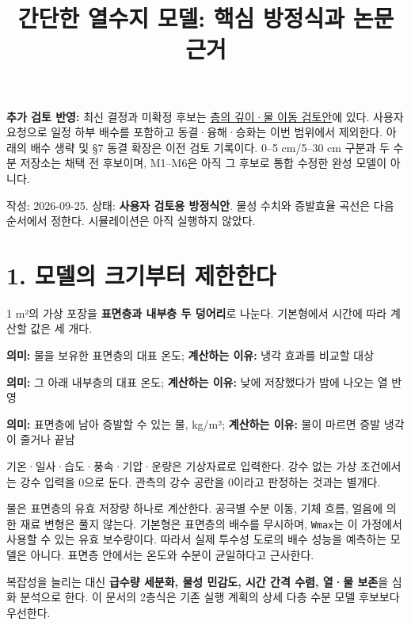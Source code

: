 \documentclass[11pt,a4paper]{article}
\title{간단한 열수지 모델: 핵심 방정식과 논문 근거}
\date{}
\begin{document}
\maketitle
\textbf{추가 검토 반영:} 최신 결정과 미확정 후보는 \href{\detokenize{layer-water-review.md}}{층의 깊이·물 이동 검토안}에 있다. 사용자 요청으로 일정 하부 배수를 포함하고 동결·융해·승화는 이번 범위에서 제외한다. 아래의 배수 생략 및 §7 동결 확장은 이전 검토 기록이다. 0–5 cm/5–30 cm 구분과 두 수분 저장소는 채택 전 후보이며, M1–M6은 아직 그 후보로 통합 수정한 완성 모델이 아니다.

작성: 2026-09-25. 상태: \textbf{사용자 검토용 방정식안}. 물성 수치와 증발효율 곡선은 다음 순서에서 정한다. 시뮬레이션은 아직 실행하지 않았다.

\section{1. 모델의 크기부터 제한한다}

1 m²의 가상 포장을 \textbf{표면층과 내부층 두 덩어리}로 나눈다. 기본형에서 시간에 따라 계산할 값은 세 개다.

\begin{description}[leftmargin=0pt,style=nextline]
\item[\texttt{Ts(t)}] \textbf{의미:} 물을 보유한 표면층의 대표 온도; \textbf{계산하는 이유:} 냉각 효과를 비교할 대상
\item[\texttt{Tb(t)}] \textbf{의미:} 그 아래 내부층의 대표 온도; \textbf{계산하는 이유:} 낮에 저장했다가 밤에 나오는 열 반영
\item[\texttt{W(t)}] \textbf{의미:} 표면층에 남아 증발할 수 있는 물, kg/m²; \textbf{계산하는 이유:} 물이 마르면 증발 냉각이 줄거나 끝남
\end{description}

기온·일사·습도·풍속·기압·운량은 기상자료로 입력한다. 강수 없는 가상 조건에서는 강수 입력을 0으로 둔다. 관측의 강수 공란을 0이라고 판정하는 것과는 별개다.

물은 표면층의 유효 저장량 하나로 계산한다. 공극별 수분 이동, 기체 흐름, 얼음에 의한 재료 변형은 풀지 않는다. 기본형은 표면층의 배수를 무시하며, \texttt{Wmax}는 이 가정에서 사용할 수 있는 유효 보수량이다. 따라서 실제 투수성 도로의 배수 성능을 예측하는 모델은 아니다. 표면층 안에서는 온도와 수분이 균일하다고 근사한다.

복잡성을 늘리는 대신 \textbf{급수량 세분화, 물성 민감도, 시간 간격 수렴, 열·물 보존}을 심화 분석으로 한다. 이 문서의 2층식은 기존 실행 계획의 상세 다층 수분 모델 후보보다 우선한다.
\end{document}
